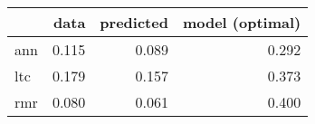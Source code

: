 \begin{tabular}{lrrr}
\toprule
{} &   data &  predicted &  model (optimal) \\
\midrule
ann &  0.115 &      0.089 &            0.292 \\
ltc &  0.179 &      0.157 &            0.373 \\
rmr &  0.080 &      0.061 &            0.400 \\
\bottomrule
\end{tabular}
